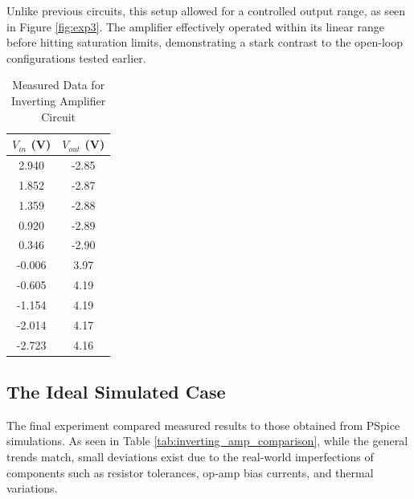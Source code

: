 \documentclass[12pt]{article}
\begin{document}
Unlike previous circuits, this setup allowed for a controlled output range, as seen in Figure \ref{fig:exp3}. The amplifier effectively operated within its linear range before hitting saturation limits, demonstrating a stark contrast to the open-loop configurations tested earlier.
\begin{table}[H]
	\centering
	\begin{tabular}{|c|c|}
		\hline
		$V_{in}$ (V) & $V_{out}$ (V) \\
		\hline
		2.940        & -2.85         \\
		1.852        & -2.87         \\
		1.359        & -2.88         \\
		0.920        & -2.89         \\
		0.346        & -2.90         \\
		-0.006       & 3.97          \\
		-0.605       & 4.19          \\
		-1.154       & 4.19          \\
		-2.014       & 4.17          \\
		-2.723       & 4.16          \\
		\hline
	\end{tabular}
	\caption{Measured Data for Inverting Amplifier Circuit}
	\label{tab:inverting_amp}
\end{table}
\subsection{The Ideal Simulated Case}
The final experiment compared measured results to those obtained from PSpice simulations. As seen in Table \ref{tab:inverting_amp_comparison}, while the general trends match, small deviations exist due to the real-world imperfections of components such as resistor tolerances, op-amp bias currents, and thermal variations.
\end{document}
